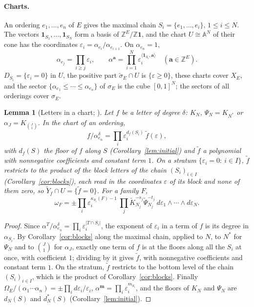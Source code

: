 \documentclass[11pt]{article}
\theoremstyle{plain}
\newtheorem{lemma}[prop]{Lemma}
\theoremstyle{definition}
\theoremstyle{remark}
\newcommand{\Z}{\mathbb Z}
\newcommand{\bm}{\mathbf m}
\newcommand{\tsig}{\widetilde\sigma}
\begin{document}
\paragraph{Charts.} An ordering $e_1,\dots,e_n$ of $E$ gives the maximal chain $S_i=\{e_1,\dots,e_i\}$, $1\le i\le N$. The vectors $\mathbf 1_{S_1},\dots,\mathbf 1_{S_N}$ form a basis of $\Z^E/\Z\mathbf 1$, and the chart $U\cong\mathbb A^N$ of their cone has the coordinates $\varepsilon_i=\alpha_{e_i}/\alpha_{e_{i+1}}$. On $\alpha_{e_n}=1$,
\[
\alpha_{e_j}=\prod_{i\ge j}\varepsilon_i,\qquad \alpha^{\mathbf a}=\prod_{i=1}^N\varepsilon_i^{\langle\mathbf 1_{S_i},\mathbf a\rangle}\quad(\mathbf a\in\Z^E).
\]
$D_{S_i}=\{\varepsilon_i=0\}$ in $U$, the positive part $\tsig_E\cap U$ is $\{\varepsilon\ge0\}$, these charts cover $X_E$, and the sector $\{\alpha_{e_1}\le\cdots\le\alpha_{e_n}\}$ of $\sigma_E$ is the cube $[0,1]^N$; the sectors of all orderings cover $\sigma_E$.

\begin{lemma}[Letters in a chart; {\cite[Thm.~8.7(ii), p.~55]{F}}]\label{lem:charts}
Let $f$ be a letter of degree $\delta$: $K_N$, $\Psi_N=K_{N^\ast}$ or $\alpha_J=K_{\binom J1}$. In the chart of an ordering,
\[
f/\alpha_{e_n}^{\delta}=\prod_i\varepsilon_i^{d_f(S_i)}\ \widetilde f(\varepsilon),
\]
with $d_f(S)$ the floor of $f$ along $S$ (Corollary~\ref{lem:initial}) and $\widetilde f$ a polynomial with nonnegative coefficients and constant term $1$. On a stratum $\{\varepsilon_i=0:\ i\in I\}$, $\widetilde f$ restricts to the product of the block letters of the chain $(S_i)_{i\in I}$ (Corollary~\ref{cor:blocks}), each read in the coordinates $\varepsilon$ of its block and none of them zero, so $\widetilde Y_f\cap U=\{\widetilde f=0\}$. For a family $F$,
\[
\omega_F=\pm\prod_i\varepsilon_i^{\kappa_{S_i}(F)-1}\ \prod_j\widetilde K_{N_j}^{-s_j}\widetilde\Psi_{N_j}^{-t_j}\ d\varepsilon_1\wedge\cdots\wedge d\varepsilon_N .
\]
\end{lemma}

\begin{proof}
Since $\alpha^T/\alpha_{e_n}^\delta=\prod_i\varepsilon_i^{|T\cap S_i|}$, the exponent of $\varepsilon_i$ in a term of $f$ is its degree in $\alpha_{S_i}$. By Corollary~\ref{cor:blocks} along the maximal chain, applied to $N$, to $N^\ast$ for $\Psi_N$ and to $\binom J1$ for $\alpha_J$, exactly one term of $f$ is at the floors along all the $S_i$ at once, with coefficient $1$; dividing by it gives $\widetilde f$, with nonnegative coefficients and constant term $1$. On the stratum, $\widetilde f$ restricts to the bottom level of the chain $(S_i)_{i\in I}$, which is the product of Corollary~\ref{cor:blocks}. Finally $\Omega_E/(\alpha_1\cdots\alpha_n)=\pm\prod_id\varepsilon_i/\varepsilon_i$, $\alpha^{\bm}=\prod_i\varepsilon_i^{m_{S_i}}$, and the floors of $K_N$ and $\Psi_N$ are $d_N(S)$ and $d^\ast_N(S)$ (Corollary~\ref{lem:initial}).
\end{proof}
\end{document}
